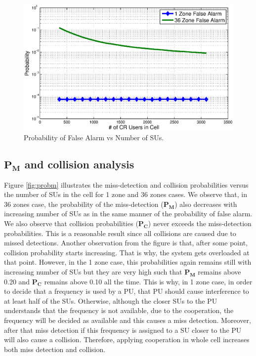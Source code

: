 \documentclass[conference,compsoc]{IEEEtran}
\newcommand{\probm}{\mathbf{P_M}}
\begin{document}
\begin{figure}[t]
\centering
\includegraphics[width=0.99\columnwidth,keepaspectratio] {figs/pf.eps}
\caption{Probability of False Alarm vs Number of SUs.}
\label{fig:probf}
\end{figure}

\subsection{$\probm$ and collision analysis}
Figure \ref{fig:probm} illustrates the miss-detection and collision probabilities versus the number of SUs in the cell for 1 zone and 36 zones cases. We observe that, in 36 zones case, the probability of the miss-detection ($\probm$) also decreases with increasing number of SUs as in the same manner of the probability of false alarm. We also observe that collision probabilities ($\mathbf{P_C}$) never exceeds the miss-detection probabilities. This is a reasonable result since all collisions are caused due to missed detections. Another observation from the figure is that, after some point, collision probability starts increasing. That is why, the system gets overloaded at that point. However, in the 1 zone case, this probabilities again remains still with increasing number of SUs but they are very high such that $\probm$ remains above 0.20 and $\mathbf{P_C}$ remains above 0.10 all the time. This is why, in 1 zone case, in order to decide that a frequency is used by a PU, that PU should cause interference to at least half of the SUs. Otherwise, although the closer SUs to the PU understands that the frequency is not available, due to the cooperation, the frequency will be decided as available and this causes a miss detection. Moreover, after that miss detection if this frequency is assigned to a SU closer to the PU will also cause a collision. Therefore, applying cooperation in whole cell increases both miss detection and collision.
\end{document}
